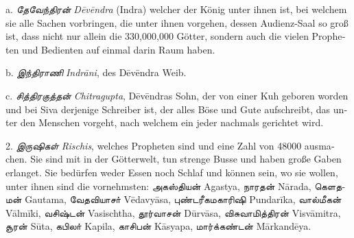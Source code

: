 \documentclass{article}
\newcommand{\TamilText}[1]{\texttamil{#1}}
\newcommand{\TamilItalic}[1]{\texttamil{\emph{#1}}}
\newcommand{\tam}[1]{\TamilText{#1}}
\newcommand{\tamitalic}[1]{\TamilItalic{#1}}
\begin{document}
{\bigskip

\textgerman{a}. \tamitalic{தேவேந்திரன்} \emph{\textgerman{D\={e}v\={e}ndra}} \textgerman{(Indra) welcher der König unter ihnen ist, bei welchem sie alle Sachen vorbringen, die unter ihnen vorgehen, dessen Audienz-Saal so groß ist, dass nicht nur allein die 330,000,000 Götter, sondern auch die vielen Propheten und Bedienten auf einmal darin Raum haben.}

\textgerman{b}. \tamitalic{இந்திராணி} \emph{\textgerman{Indr\={a}ni}}, \textgerman{des D\={e}v\={e}ndra Weib.}

\textgerman{c}. \tamitalic{சித்திரகுத்தன்} \emph{\textgerman{Chitragupta}}, \textgerman{D\={e}v\={e}ndras Sohn, der von einer Kuh geboren worden und bei Siva derjenige Schreiber ist, der alles Böse und Gute aufschreibt, das unter den Menschen vorgeht, nach welchem ein jeder nachmals gerichtet wird.}

\bigskip

2. \tamitalic{இருஷிகள்} \emph{\textgerman{Rischis}}, \textgerman{welches Propheten sind und eine Zahl von 48000 ausmachen. Sie sind mit in der Götterwelt, tun strenge Busse und haben große Gaben erlanget. Sie bedürfen weder Essen noch Schlaf und können sein, wo sie wollen, unter ihnen sind die vornehmsten: \tam{அகஸ்தியன்} Agastya, \tam{நாரதன்} N\={a}rada, \tam{கெளதமன்} Gautama, \tam{வேதவியாசா்} V\={e}davy\={a}sa, \tam{புண்டரீகமகாரிஷி} Pundar\={i}ka, \tam{வால்மீகன்} V\={a}lm\={i}ki, \tam{வசிஷ்டன்} Vasischtha, \tam{தூர்வாசன்} D\={u}rv\={a}sa, \tam{விசுவாமித்திரன்} Visv\={a}mitra, \tam{சூரன்} S\={u}ta, \tam{கபிலா்} Kapila, \tam{காசிபன்} K\={a}syapa, \tam{மார்க்கண்டன்} M\={a}rkand\={e}ya.}

}
\end{document}
